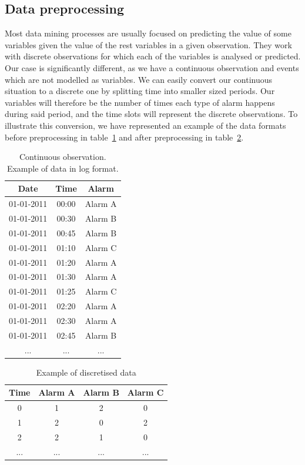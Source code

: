 \documentclass[a4paper,12pt]{article}
\begin{document}
\subsection{Data preprocessing}

Most data mining processes are usually focused on predicting the value of some variables given the value of the rest variables in a given observation. They work with discrete observations for which each of the variables is analysed or predicted. Our case is significantly different, as we have a continuous observation and events which are not modelled as variables. We can easily convert our continuous situation to a discrete one by splitting time into smaller sized periods. Our variables will therefore be the number of times each type of alarm happens during said period, and the time slots will represent the discrete observations. To illustrate this conversion, we have represented an example of the data formats before preprocessing in table~\ref{tab:data_before} and after preprocessing in table~\ref{tab:data_after}.

\begin{table}
\begin{center}
\begin{tabular}{|c|c|c|}
\hline Date & Time & Alarm \\ 
\hline 01-01-2011 & 00:00 & Alarm A \\ 
\hline 01-01-2011 & 00:30 & Alarm B \\ 
\hline 01-01-2011 & 00:45 & Alarm B \\ 
\hline 01-01-2011 & 01:10 & Alarm C \\ 
\hline 01-01-2011 & 01:20 & Alarm A \\ 
\hline 01-01-2011 & 01:30 & Alarm A \\ 
\hline 01-01-2011 & 01:25 & Alarm C \\ 
\hline 01-01-2011 & 02:20 & Alarm A \\ 
\hline 01-01-2011 & 02:30 & Alarm A \\ 
\hline 01-01-2011 & 02:45 & Alarm B \\ 
\hline ... & ... & ... \\ 
\hline 
\end{tabular} 
\end{center} 
\caption {Continuous observation. Example of data in log format.} \label{tab:data_before} 
\end{table}

\begin{table}
\begin{center}
\begin{tabular}{|c|c|c|c|}
\hline Time & Alarm A & Alarm B & Alarm C \\ 
\hline 0 & 1 & 2 & 0 \\ 
\hline 1 & 2 & 0 & 2 \\ 
\hline 2 & 2 & 1 & 0 \\ 
\hline ... & ... & ... & ... \\ 
\hline 
\end{tabular} 
\end{center} 
\caption {Example of discretised data} \label{tab:data_after} 
\end{table}
\end{document}
